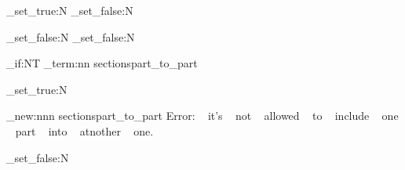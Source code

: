 \NewDocumentCommand{\sections@frame@bgn}{ }
{
    \bool_set_true:N  \sections@bInSection
    \bool_set_false:N \sections@binSubSection

    

    \sections@@onSection@bgn
}

\NewDocumentCommand{\sections@frame@end}{ }
{
    \sections@@onSection@end
    
    \bool_set_false:N \sections@bInSection
    \bool_set_false:N \sections@binSubSection
}

\NewDocumentCommand{\sections@register}{ }
{
    \sections@markSectionAsAdded{\frmNameSection}

    {
        \sections@addAppendix{\frmNameSection}
    }
}

\NewDocumentCommand{\sections@part@bgn}{}
{
    \bool_if:NT \sections@binSubSection
    {
        \msg_term:nn {sections}{part_to_part}
    }

    \bool_set_true:N \sections@binSubSection

    \sections@@onPart@bgn
}
\msg_new:nnn {sections}{part_to_part}
{
    Error: ~ it's ~ not ~ allowed ~ to ~ include ~ one ~ part ~ into ~ atnother ~ one.
}

\NewDocumentCommand{\sections@part@end}{}
{
    \sections@@onPart@end

    \bool_set_false:N \sections@binSubSection
}

